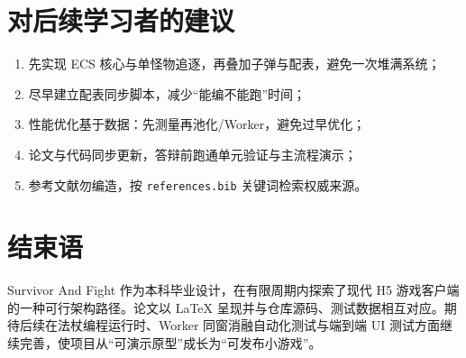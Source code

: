 \section{对后续学习者的建议}

\begin{enumerate}[label=\arabic*.]
  \item 先实现 ECS 核心与单怪物追逐，再叠加子弹与配表，避免一次堆满系统；
  \item 尽早建立配表同步脚本，减少“能编不能跑”时间；
  \item 性能优化基于数据：先测量再池化/Worker，避免过早优化；
  \item 论文与代码同步更新，答辩前跑通单元验证与主流程演示；
  \item 参考文献勿编造，按 \texttt{references.bib} 关键词检索权威来源。
\end{enumerate}

\section{结束语}

Survivor And Fight 作为本科毕业设计，在有限周期内探索了现代 H5 游戏客户端的一种可行架构路径。论文以 LaTeX 呈现并与仓库源码、测试数据相互对应。期待后续在法杖编程运行时、Worker 同窗消融自动化测试与端到端 UI 测试方面继续完善，使项目从“可演示原型”成长为“可发布小游戏”。
